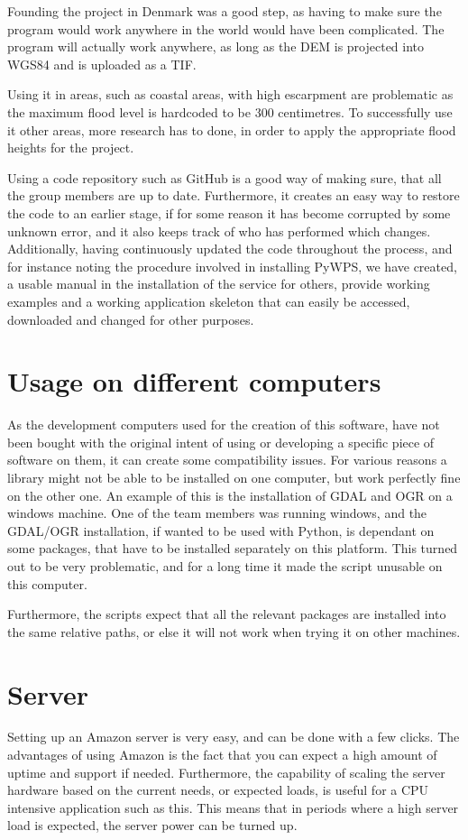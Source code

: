 Founding the project in Denmark was a good step, as having to make sure the program would work anywhere in the world would have been complicated. The program will actually work anywhere, as long as the DEM is projected into WGS84 and is uploaded as a TIF. 

Using it in areas, such as coastal areas, with high escarpment are problematic as the maximum flood level is hardcoded to be 300 centimetres. To successfully use it other areas, more research has to done, in order to apply the appropriate flood heights for the project.

Using a code repository such as GitHub is a good way of making sure, that all the group members are up to date. Furthermore, it creates an easy way to restore the code to an earlier stage, if for some reason it has become corrupted by some unknown error, and it also keeps track of who has performed which changes. Additionally, having continuously updated the code throughout the process, and for instance noting the procedure involved in installing PyWPS, we have created,  a usable manual in the installation of the service for others, provide working examples and a working application skeleton that can easily be accessed, downloaded and changed for other purposes.

\section{Usage on different computers}
As the development computers used for the creation of this software, have not been bought with the original intent of using or developing a specific piece of software on them, it can create some compatibility issues. For various reasons a library might not be able to be installed on one computer, but work perfectly fine on the other one. An example of this is the installation of GDAL and OGR on a windows machine. One of the team members was running windows, and the GDAL/OGR installation, if wanted to be used with Python, is dependant on some packages, that have to be installed separately on this platform. This turned out to be very problematic, and for a long time it made the script unusable on this computer.

Furthermore, the scripts expect that all the relevant packages are installed into the same relative paths, or else it will not work when trying it on other machines.

\section{Server}
Setting up an Amazon server is very easy, and can be done with a few clicks. The advantages of using Amazon is the fact that you can expect a high amount of uptime and support if needed. Furthermore, the capability of scaling the server hardware based on the current needs, or expected loads, is useful for a CPU intensive application such as this. This means that in periods where a high server load is expected, the server power can be turned up.

